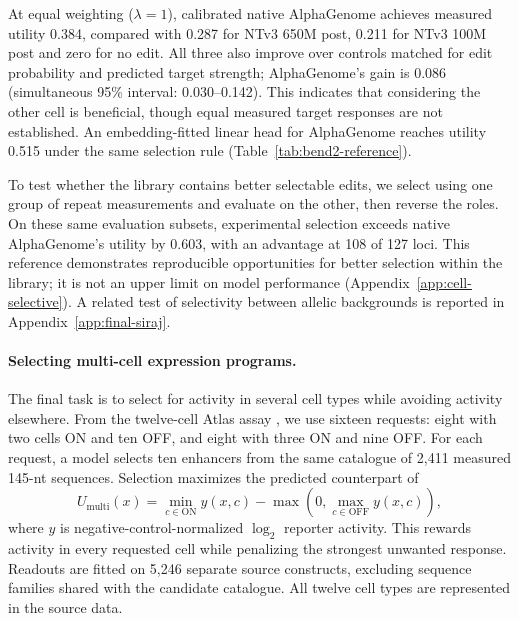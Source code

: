At equal weighting ($\lambda=1$), calibrated native AlphaGenome
achieves measured utility 0.384, compared with 0.287 for NTv3
650M post, 0.211 for NTv3 100M post and zero for no edit.
All three also improve over controls matched for edit probability
and predicted target strength; AlphaGenome's gain is 0.086
(simultaneous 95\% interval: 0.030--0.142).
This indicates that considering the other cell is beneficial, though equal measured target responses are not established. An embedding-fitted linear head for AlphaGenome reaches utility 0.515 under the same selection
rule (Table~\ref{tab:bend2-reference}).

To test whether the library contains better selectable edits,
we select using one group of repeat measurements and evaluate on the other,
then reverse the roles. On these same evaluation subsets,
experimental selection exceeds native AlphaGenome's utility by
0.603, with an advantage at 108 of 127 loci.
This reference demonstrates reproducible opportunities for
better selection within the library; it is not an upper limit
on model performance (Appendix~\ref{app:cell-selective}).
A related test of selectivity between allelic backgrounds is
reported in Appendix~\ref{app:final-siraj}.



\paragraph{Selecting multi-cell expression programs.}
\label{sec:multicell-programming}

The final task is to select for activity in several cell types while
avoiding activity elsewhere. From the twelve-cell Atlas assay
\citep{castillohair2025atlas}, we use sixteen requests: eight
with two cells ON and ten OFF, and eight with three ON and
nine OFF. For each request, a model selects ten enhancers from
the same catalogue of 2,411 measured 145-nt sequences.
Selection maximizes the predicted counterpart of
\begin{equation}
 U_{\mathrm{multi}}(x)
 =
 \min_{c\in\mathrm{ON}}y(x,c)
 -
 \max\!\left(0,\max_{c\in\mathrm{OFF}}y(x,c)\right),
 \label{eq:multicell-utility}
\end{equation}
where $y$ is negative-control-normalized $\log_2$ reporter
activity. This rewards activity in every requested cell while
penalizing the strongest unwanted response. Readouts are fitted
on 5,246 separate source constructs, excluding sequence families
shared with the candidate catalogue. All twelve cell types are
represented in the source data.

